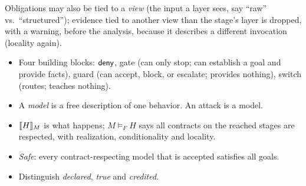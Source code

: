 Obligations may also be tied to a \emph{view} (the input a layer sees, say ``raw'' vs.\ ``structured''); evidence tied to another view than the stage's layer is dropped, with a warning, before the analysis, because it describes a different invocation (locality again).

\begin{recap}
\begin{itemize}
\item Four building blocks: $\mathsf{deny}$, gate (can only stop; can establish a goal and provide facts), guard (can accept, block, or escalate; provides nothing), switch (routes; teaches nothing).
\item A \emph{model} is a free description of one behavior. An attack is a model.
\item $\llbracket H\rrbracket_{M}$ is what happens; $M\models_F H$ says all contracts on the reached stages are respected, with realization, conditionality and locality.
\item \emph{Safe}: every contract-respecting model that is accepted satisfies all goals.
\item Distinguish \emph{declared}, \emph{true} and \emph{credited}.
\end{itemize}
\end{recap}
